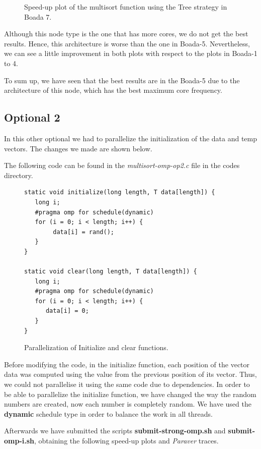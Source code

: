 \documentclass[12pt, a4paper]{article}
\begin{document}
\begin{figure}[H]
\begin{minipage}[b]{0.4\linewidth}
  \caption{Speed-up plot of the multisort function using the Tree strategy in Boada 7.}
  \label{fig:mandel-omp-10000-strong-21-speedup}
\end{minipage}
\end{figure}

Although this node type is the one that has more cores, we do not get the best results. Hence, this architecture is worse than the one in Boada-5. Nevertheless, we can see a little improvement in both plots with respect to the plots in Boada-1 to 4.

To sum up, we have seen that the best results are in the Boada-5 due to the architecture of this node, which has the best maximum core frequency.

\subsection{Optional 2}

In this other optional we had to parallelize the initialization of the data and temp vectors. The changes we made are shown below.

The following code can be found in the \textit{multisort-omp-op2.c} file in the codes directory.

\begin{figure}[H]
\begin{lstlisting}
static void initialize(long length, T data[length]) {
   long i;
   #pragma omp for schedule(dynamic)
   for (i = 0; i < length; i++) {
		data[i] = rand();
   }
}

static void clear(long length, T data[length]) {
   long i;
   #pragma omp for schedule(dynamic)
   for (i = 0; i < length; i++) {
      data[i] = 0;
   }
}
\end{lstlisting}

\caption{Parallelization of Initialize and clear functions.}
\end{figure}

Before modifying the code, in the initialize function, each position of the vector data was computed using the value from the previous position of its vector. Thus, we could not parallelise it using the same code due to dependencies. In order to be able to parallelize the initialize function, we have changed the way the random numbers are created, now each number is completely random. We have used the \textbf{dynamic} schedule type in order to balance the work in all threads.

Afterwards we have submitted the scripts \textbf{submit-strong-omp.sh} and \textbf{submit-omp-i.sh}, obtaining the following speed-up plots and \textit{Paraver} traces.
\end{document}
